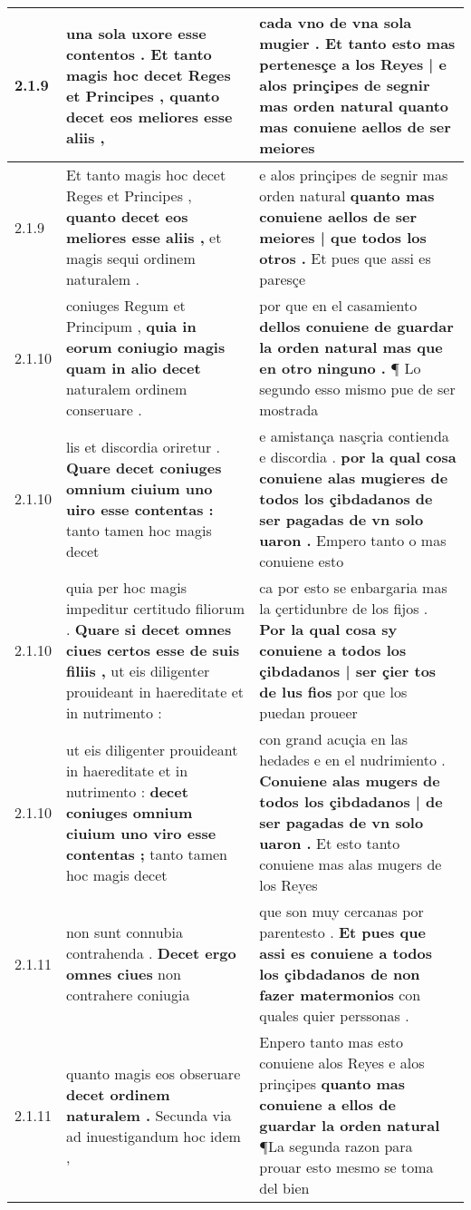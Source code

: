 \begin{tabular}{|p{1cm}|p{6.5cm}|p{6.5cm}|}
2.1.9 & una sola uxore esse contentos . \textbf{ Et tanto magis hoc decet Reges et Principes , } quanto decet eos meliores esse aliis , & cada vno de vna sola mugier . \textbf{ Et tanto esto mas pertenesçe a los Reyes | e alos prinçipes de segnir mas orden natural } quanto mas conuiene aellos de ser meiores \\\hline
2.1.9 & Et tanto magis hoc decet Reges et Principes , \textbf{ quanto decet eos meliores esse aliis , } et magis sequi ordinem naturalem . & e alos prinçipes de segnir mas orden natural \textbf{ quanto mas conuiene aellos de ser meiores | que todos los otros . } Et pues que assi es paresçe \\\hline
2.1.10 & coniuges Regum et Principum , \textbf{ quia in eorum coniugio magis quam in alio decet } naturalem ordinem conseruare . & por que en el casamiento \textbf{ dellos conuiene de guardar la orden natural mas que en otro ninguno . } ¶ Lo segundo esso mismo pue de ser mostrada \\\hline
2.1.10 & lis et discordia oriretur . \textbf{ Quare decet coniuges omnium ciuium uno uiro esse contentas : } tanto tamen hoc magis decet & e amistança nasçria contienda e discordia . \textbf{ por la qual cosa conuiene alas mugieres de todos los çibdadanos de ser pagadas de vn solo uaron . } Empero tanto o mas conuiene esto \\\hline
2.1.10 & quia per hoc magis impeditur certitudo filiorum . \textbf{ Quare si decet omnes ciues certos esse de suis filiis , } ut eis diligenter prouideant in haereditate et in nutrimento : & ca por esto se enbargaria mas la çertidunbre de los fijos . \textbf{ Por la qual cosa sy conuiene a todos los çibdadanos | ser çier tos de lus fios } por que los puedan proueer \\\hline
2.1.10 & ut eis diligenter prouideant in haereditate et in nutrimento : \textbf{ decet coniuges omnium ciuium uno viro esse contentas ; } tanto tamen hoc magis decet & con grand acuçia en las hedades e en el nudrimiento . \textbf{ Conuiene alas mugers de todos los çibdadanos | de ser pagadas de vn solo uaron . } Et esto tanto conuiene mas alas mugers de los Reyes \\\hline
2.1.11 & non sunt connubia contrahenda . \textbf{ Decet ergo omnes ciues } non contrahere coniugia & que son muy cercanas por parentesto . \textbf{ Et pues que assi es conuiene a todos los çibdadanos de non fazer matermonios } con quales quier perssonas . \\\hline
2.1.11 & quanto magis eos obseruare \textbf{ decet ordinem naturalem . } Secunda via ad inuestigandum hoc idem , & Enpero tanto mas esto conuiene alos Reyes e alos prinçipes \textbf{ quanto mas conuiene a ellos de guardar la orden natural } ¶La segunda razon para prouar esto mesmo se toma del bien \\\hline

\end{tabular}
